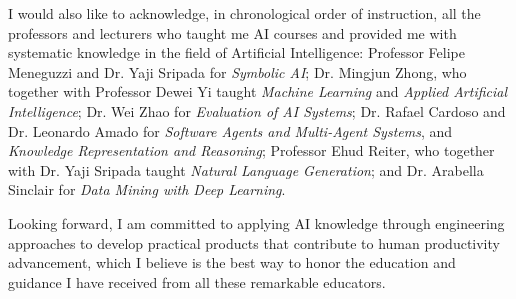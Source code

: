 \documentclass[MSc]{abdnthesis}
\begin{document}
\begin{acknowledgements}
  I would also like to acknowledge, in chronological order of instruction, all the professors and lecturers who taught me AI courses and provided me with systematic knowledge in the field of Artificial Intelligence: Professor Felipe Meneguzzi and Dr. Yaji Sripada for \textit{Symbolic AI}; Dr. Mingjun Zhong, who together with Professor Dewei Yi taught \textit{Machine Learning} and \textit{Applied Artificial Intelligence}; Dr. Wei Zhao for \textit{Evaluation of AI Systems}; Dr. Rafael Cardoso and Dr. Leonardo Amado for \textit{Software Agents and Multi-Agent Systems}, and \textit{Knowledge Representation and Reasoning}; Professor Ehud Reiter, who together with Dr. Yaji Sripada taught \textit{Natural Language Generation}; and Dr. Arabella Sinclair for \textit{Data Mining with Deep Learning}.
  
  Looking forward, I am committed to applying AI knowledge through engineering approaches to develop practical products that contribute to human productivity advancement, which I believe is the best way to honor the education and guidance I have received from all these remarkable educators.
\end{acknowledgements}

\tableofcontents












\appendix
% 


\end{document}
